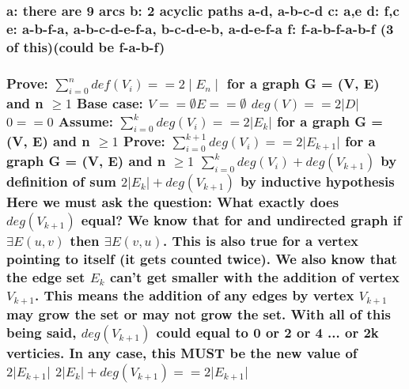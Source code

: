 \documentclass{article}
\begin{document}
\setcounter{tocdepth}{3}

\setcounter{section}{9}
\setcounter{subsection}{2}
\setcounter{subsubsection}{0}
\subsubsection{
a: there are 9 arcs\newline
b: 2 acyclic paths a-d, a-b-c-d\newline
c: a,e\newline
d: f,c\newline
e: a-b-f-a, a-b-c-d-e-f-a, b-c-d-e-b, a-d-e-f-a\newline
f: f-a-b-f-a-b-f (3 of this)(could be f-a-b-f)
}

\setcounter{section}{9}
\setcounter{subsection}{3}
\setcounter{subsubsection}{4}
\subsubsection{
Prove: $ \sum\limits_{i=0}^n def(V_i) == 2 \mid E_n \mid$ for a graph G = (V, E) and n $\geq{1}$ \newline
Base case:\newline
$V == \emptyset E == \emptyset $\newline
$deg( V) == 2 \vert D \vert$ \newline
$0 == 0$\newline
Assume: $ \sum\limits_{i=0}^k deg(V_i) == 2\vert E_k\vert$  for a graph G = (V, E) and n $\geq{1}$\newline
Prove: $ \sum\limits_{i=0}^{k+1} deg(V_i) == 2\vert E_{k+1} \vert$  for a graph G = (V, E) and n $\geq{1}$\newline
$ \sum\limits_{i=0}^{k} deg(V_i) + deg(V_{k+1}) $ by definition of sum \newline
$ 2 \vert E_k\vert + deg(V_{k+1}) $ by inductive hypothesis\newline
Here we must ask the question: What exactly does $deg(V_{k+1})$ equal? We know that for and undirected graph if $\exists E(u,v)$ then $\exists E(v,u)$. This is also true for a vertex pointing to itself (it gets counted twice). We also know that the edge set $E_k$ can't get smaller with the addition of vertex $V_{k+1}$. This means the addition of any edges by vertex $V_{k+1}$ may grow the set or may not grow the set. With all of this being said, $deg(V_{k+1})$ could equal to 0 or 2 or 4 ... or 2k verticies. In any case, this MUST be the new value of $ 2 \vert E_{k+1}\vert $\newline
$ 2 \vert E_k\vert + deg(V_{k+1})  == 2\vert E_{k+1} \vert$
}
\end{document}
